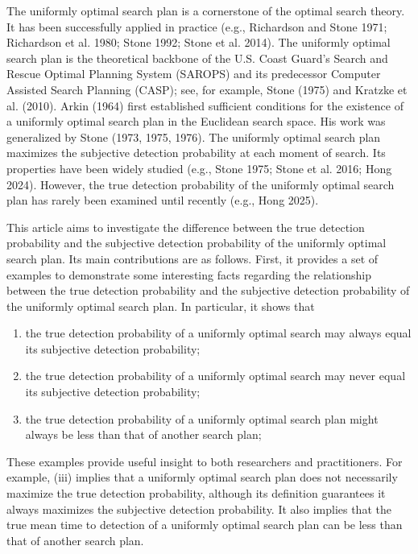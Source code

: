 \documentclass[12pt]{article}
\theoremstyle{plain}
\theoremstyle{definition}
\theoremstyle{remark}
\begin{document}
The uniformly optimal search plan is a cornerstone of the optimal search theory.  It has been successfully applied in practice (e.g.,  Richardson and Stone 1971; Richardson et al.  1980; Stone 1992; Stone et al.  2014).  The uniformly optimal search plan is the theoretical backbone of the U.S. Coast Guard's Search and Rescue Optimal Planning System (SAROPS) and its predecessor Computer Assisted Search Planning (CASP); see, for example,  Stone (1975) and Kratzke et al. (2010).  Arkin (1964) first established sufficient conditions for the existence of a uniformly optimal search plan in the Euclidean search space.   His work was generalized by Stone (1973, 1975, 1976).   The uniformly optimal search plan maximizes the subjective detection probability at each moment of search.  Its properties have been widely studied (e.g., Stone 1975; Stone et al. 2016; Hong 2024).  However,  the true detection probability of the uniformly optimal search plan has rarely been examined until recently (e.g., Hong 2025).  

This article aims to investigate the difference between the true detection probability and the subjective detection probability of the uniformly optimal search plan.  Its main contributions are as follows.  First,  it provides a set of examples to demonstrate some interesting facts regarding the relationship between the true detection probability and the subjective detection probability of the uniformly optimal search plan. In particular, it shows that
\begin{enumerate}
\item[(i)]the true detection probability of a uniformly optimal search may always equal its subjective detection probability;
\item[(ii)]the true detection probability of a uniformly optimal search may never equal its subjective detection probability;
\item[(iii)]the true detection probability of a uniformly optimal search plan might always be less than that of another search plan;
\end{enumerate}
These examples provide useful insight to both researchers and practitioners. For example,  (iii) implies that a uniformly optimal search plan does not necessarily maximize the true detection probability, although its definition guarantees it always maximizes the subjective detection probability.  It also implies that the true mean time to detection of a uniformly optimal search plan can be less than that of another search plan.  
\end{document}
